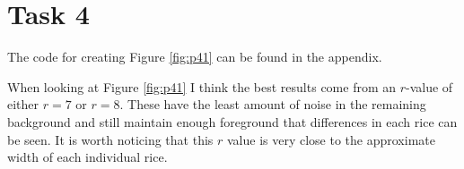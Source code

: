 \section{Task 4}
The code for creating Figure \ref{fig:p41} can be found in the appendix.


When looking at Figure \ref{fig:p41} I think the best results come from an $r$-value of either $r=7$ or $r=8$.
These have the least amount of noise in the remaining background and still maintain enough foreground
that differences in each rice can be seen. It is worth noticing that this $r$ value is very close to
the approximate width of each individual rice.